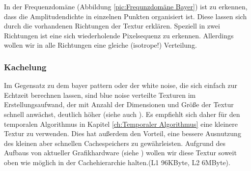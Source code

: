 In der Frequenzdomäne (Abbildung \ref{pic:Frequnzdomäne Bayer}) ist zu erkennen, dass die Amplitudendichte in einzelnen
Punkten organisiert ist. Diese lassen sich durch die vorhandenen
Richtungen der Textur erklären. Speziell in zwei Richtungen ist eine sich
wiederholende Pixelsequenz zu erkennen.
Allerdings wollen wir in alle Richtungen eine gleiche (isotrope!) 
Verteilung.

\subsubsection{Kachelung}
\label{ch:Content1:sec:blue noise:Kachelung}

Im Gegensatz zu dem bayer pattern oder der white noise, die sich einfach zur Echtzeit berechnen lassen,
sind blue noise verteilte Texturen im Erstellungsaufwand, der mit Anzahl der Dimensionen 
und Größe der Textur schnell anwächst, deutlich höher (siehe auch \cite{bluenoisechrisschied}). 
Es empfiehlt sich daher für den temporalen Algorithmus in Kapitel \ref{ch:Temporaler Algorithmus} eine 
kleinere Textur zu verwenden.
Dies hat außerdem den Vorteil, eine bessere Ausnutzung des kleinen aber schnellen Cachespeichers zu gewährleisten.
Aufgrund des Aufbaus von aktueller Grafikhardware (siehe \cite{turingarchitecture}) wollen wir diese Textur
soweit oben wie möglich in der Cachehierarchie halten.(L1 96KByte, L2 6MByte).

